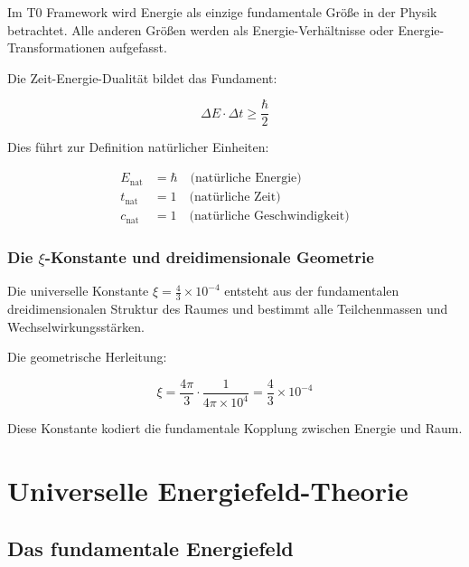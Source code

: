 	\begin{prinzip}
		Im T0 Framework wird Energie als einzige fundamentale Größe in der Physik betrachtet. Alle anderen Größen werden als Energie-Verhältnisse oder Energie-Transformationen aufgefasst.
	\end{prinzip}
	
	Die Zeit-Energie-Dualität bildet das Fundament:
	
	\begin{equation}
		\Delta E \cdot \Delta t \geq \frac{\hbar}{2}
	\end{equation}
	
	Dies führt zur Definition natürlicher Einheiten:
	
	\begin{align}
		E_{\text{nat}} &= \hbar \quad \text{(natürliche Energie)} \\
		t_{\text{nat}} &= 1 \quad \text{(natürliche Zeit)} \\
		c_{\text{nat}} &= 1 \quad \text{(natürliche Geschwindigkeit)}
	\end{align}
	
	\subsection{Die $\xi$-Konstante und dreidimensionale Geometrie}
	
	\begin{erkenntnis}
		Die universelle Konstante $\xi = \frac{4}{3} \times 10^{-4}$ entsteht aus der fundamentalen dreidimensionalen Struktur des Raumes und bestimmt alle Teilchenmassen und Wechselwirkungsstärken.
	\end{erkenntnis}
	
	Die geometrische Herleitung:
	
	\begin{equation}
		\xi = \frac{4\pi}{3} \cdot \frac{1}{4\pi \times 10^4} = \frac{4}{3} \times 10^{-4}
	\end{equation}
	
	Diese Konstante kodiert die fundamentale Kopplung zwischen Energie und Raum.
	
	\chapter{Universelle Energiefeld-Theorie}
	
	\section{Das fundamentale Energiefeld}
	
